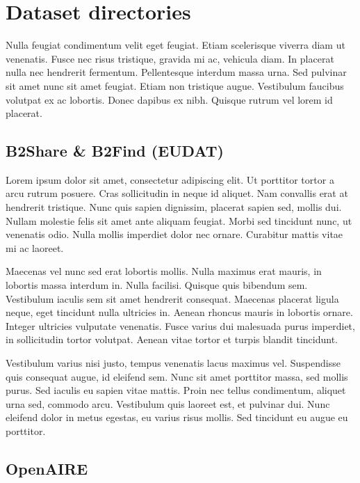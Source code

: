 
\section{Dataset directories} %
\label{sec:dataset_directories}


Nulla feugiat condimentum velit eget feugiat. Etiam scelerisque viverra diam ut venenatis. Fusce nec risus tristique, gravida mi ac, vehicula diam. In placerat nulla nec hendrerit fermentum. Pellentesque interdum massa urna. Sed pulvinar sit amet nunc sit amet feugiat. Etiam non tristique augue. Vestibulum faucibus volutpat ex ac lobortis. Donec dapibus ex nibh. Quisque rutrum vel lorem id placerat.

\subsection{B2Share \& B2Find (EUDAT)} %
\label{sub:b2share_b2find_eudat}

Lorem ipsum dolor sit amet, consectetur adipiscing elit. Ut porttitor tortor a arcu rutrum posuere. Cras sollicitudin in neque id aliquet. Nam convallis erat at hendrerit tristique. Nunc quis sapien dignissim, placerat sapien sed, mollis dui. Nullam molestie felis sit amet ante aliquam feugiat. Morbi sed tincidunt nunc, ut venenatis odio. Nulla mollis imperdiet dolor nec ornare. Curabitur mattis vitae mi ac laoreet.

Maecenas vel nunc sed erat lobortis mollis. Nulla maximus erat mauris, in lobortis massa interdum in. Nulla facilisi. Quisque quis bibendum sem. Vestibulum iaculis sem sit amet hendrerit consequat. Maecenas placerat ligula neque, eget tincidunt nulla ultricies in. Aenean rhoncus mauris in lobortis ornare. Integer ultricies vulputate venenatis. Fusce varius dui malesuada purus imperdiet, in sollicitudin tortor volutpat. Aenean vitae tortor et turpis blandit tincidunt.

Vestibulum varius nisi justo, tempus venenatis lacus maximus vel. Suspendisse quis consequat augue, id eleifend sem. Nunc sit amet porttitor massa, sed mollis purus. Sed iaculis eu sapien vitae mattis. Proin nec tellus condimentum, aliquet urna sed, commodo arcu. Vestibulum quis laoreet est, et pulvinar dui. Nunc eleifend dolor in metus egestas, eu varius risus mollis. Sed tincidunt eu augue eu porttitor.


\subsection{OpenAIRE} %
\label{sub:openaire}

